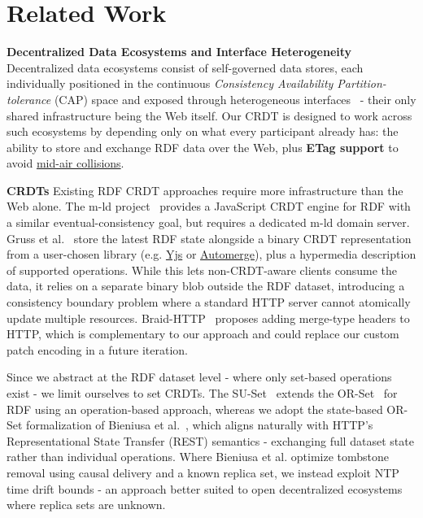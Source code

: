 \documentclass[runningheads]{llncs}
\begin{document}
    \section{Related Work}
    \label{sota}

    \textbf{Decentralized Data Ecosystems and Interface Heterogeneity}
    Decentralized data ecosystems consist of self-governed data stores,
    each individually positioned in the continuous \textit{Consistency Availability Partition-tolerance} (CAP) space and exposed through heterogeneous interfaces~\cite{phd-symposium} -
    their only shared infrastructure being the Web itself.
    Our CRDT is designed to work across such ecosystems by depending only on what every participant already has:
    the ability to store and exchange RDF data over the Web, plus \textbf{ETag support} to avoid
    \href{https://developer.mozilla.org/en-US/docs/Web/HTTP/Reference/Headers/ETag}{mid-air collisions}.


    \textbf{CRDTs}
    Existing RDF CRDT approaches require more infrastructure than the Web alone.
    The m-ld project~\cite{m-ld} provides a JavaScript CRDT engine for RDF with a similar eventual-consistency goal,
    but requires a dedicated m-ld domain server.
    Gruss et al.~\cite{solid-crdt-yjs} store the latest RDF state alongside a binary CRDT representation from a user-chosen library
    (e.g. \href{https://yjs.dev/}{Yjs} or \href{https://automerge.org/}{Automerge}),
    plus a hypermedia description of supported operations.
    While this lets non-CRDT-aware clients consume the data, it relies on a separate binary blob outside the RDF dataset,
    introducing a consistency boundary problem where a standard HTTP server cannot atomically update multiple resources.
    Braid-HTTP~\cite{braid} proposes adding merge-type headers to HTTP,
    which is complementary to our approach and could replace our custom patch encoding in a future iteration.

    Since we abstract at the RDF dataset level - where only set-based operations exist - we limit ourselves to set CRDTs.
    The SU-Set~\cite{rdf-crdt} extends the OR-Set~\cite{CRDTs} for RDF using an operation-based approach,
    whereas we adopt the state-based OR-Set formalization of Bieniusa et al.~\cite{optimized-set-crdt},
    which aligns naturally with HTTP's Representational State Transfer (REST) semantics -
    exchanging full dataset state rather than individual operations.
    Where Bieniusa et al. optimize tombstone removal using causal delivery and a known replica set,
    we instead exploit NTP time drift bounds - an approach better suited to open decentralized ecosystems where replica sets are unknown.
\end{document}
